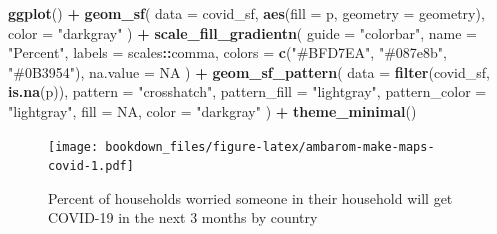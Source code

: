 \documentclass[
]{krantz}
\makeatletter
\newenvironment{Shaded}{\begin{snugshade}}{\end{snugshade}}
\newcommand{\AttributeTok}[1]{\textcolor[rgb]{0.27,0.27,0.27}{#1}}
\newcommand{\ConstantTok}[1]{\textcolor[rgb]{0.37,0.37,0.37}{#1}}
\newcommand{\FunctionTok}[1]{\textcolor[rgb]{0.27,0.27,0.27}{\textbf{#1}}}
\newcommand{\NormalTok}[1]{#1}
\newcommand{\SpecialCharTok}[1]{\textcolor[rgb]{0.43,0.43,0.43}{\textbf{#1}}}
\newcommand{\StringTok}[1]{\textcolor[rgb]{0.5,0.5,0.5}{#1}}
\newenvironment{kframe}{%
\medskip{}
\setlength{\fboxsep}{.8em}
 \def\at@end@of@kframe{}%
 \ifinner\ifhmode%
  \def\at@end@of@kframe{\end{minipage}}%
  \begin{minipage}{\columnwidth}%
 \fi\fi%
 \def\FrameCommand##1{\hskip\@totalleftmargin \hskip-\fboxsep
 \colorbox{shadecolor}{##1}\hskip-\fboxsep
     \hskip-\linewidth \hskip-\@totalleftmargin \hskip\columnwidth}%
 \MakeFramed {\advance\hsize-\width
   \@totalleftmargin\z@ \linewidth\hsize
   \@setminipage}}%
 {\par\unskip\endMakeFramed%
 \at@end@of@kframe}
\renewenvironment{Shaded}{\begin{kframe}}{\end{kframe}}
\makeatother
\begin{document}
\begin{Shaded}
\begin{Highlighting}[]
\FunctionTok{ggplot}\NormalTok{() }\SpecialCharTok{+}
  \FunctionTok{geom\_sf}\NormalTok{(}
    \AttributeTok{data =}\NormalTok{ covid\_sf,}
    \FunctionTok{aes}\NormalTok{(}\AttributeTok{fill =}\NormalTok{ p, }\AttributeTok{geometry =}\NormalTok{ geometry),}
    \AttributeTok{color =} \StringTok{"darkgray"}
\NormalTok{  ) }\SpecialCharTok{+}
  \FunctionTok{scale\_fill\_gradientn}\NormalTok{(}
    \AttributeTok{guide =} \StringTok{"colorbar"}\NormalTok{,}
    \AttributeTok{name =} \StringTok{"Percent"}\NormalTok{,}
    \AttributeTok{labels =}\NormalTok{ scales}\SpecialCharTok{::}\NormalTok{comma,}
    \AttributeTok{colors =} \FunctionTok{c}\NormalTok{(}\StringTok{"\#BFD7EA"}\NormalTok{, }\StringTok{"\#087e8b"}\NormalTok{, }\StringTok{"\#0B3954"}\NormalTok{),}
    \AttributeTok{na.value =} \ConstantTok{NA}
\NormalTok{  ) }\SpecialCharTok{+}
  \FunctionTok{geom\_sf\_pattern}\NormalTok{(}
    \AttributeTok{data =} \FunctionTok{filter}\NormalTok{(covid\_sf, }\FunctionTok{is.na}\NormalTok{(p)),}
    \AttributeTok{pattern =} \StringTok{"crosshatch"}\NormalTok{,}
    \AttributeTok{pattern\_fill =} \StringTok{"lightgray"}\NormalTok{,}
    \AttributeTok{pattern\_color =} \StringTok{"lightgray"}\NormalTok{,}
    \AttributeTok{fill =} \ConstantTok{NA}\NormalTok{,}
    \AttributeTok{color =} \StringTok{"darkgray"}
\NormalTok{  ) }\SpecialCharTok{+}
  \FunctionTok{theme\_minimal}\NormalTok{()}
\end{Highlighting}
\end{Shaded}

\begin{figure}
\centering
\texttt{[image: bookdown\_files/figure-latex/ambarom-make-maps-covid-1.pdf]}
\caption{\label{fig:ambarom-make-maps-covid}Percent of households worried someone in their household will get COVID-19 in the next 3 months by country}
\end{figure}
\end{document}

